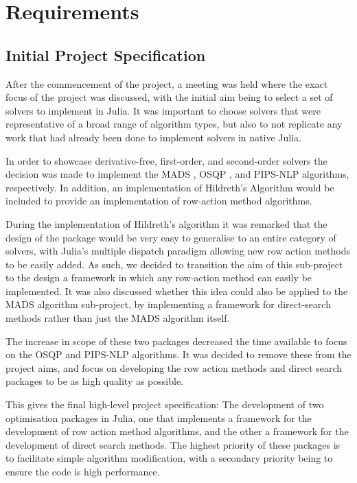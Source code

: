 \section{Requirements}\label{sec:requirements}
\subsection{Initial Project Specification}
After the commencement of the project, a meeting was held where the exact focus of the project was discussed, with the initial aim being to select a set of solvers to implement in Julia. It was important to choose solvers that were representative of a broad range of algorithm types, but also to not replicate any work that had already been done to implement solvers in native Julia. 

In order to showcase derivative-free, first-order, and second-order solvers the decision was made to implement the \ac{MADS} \cite{Audet2007MeshOptimization}, OSQP \cite{Stellato2017OSQP:Programs}, and PIPS-NLP \cite{ChiangStructuredPIPS-NLP} algorithms, respectively. In addition, an implementation of Hildreth's Algorithm \cite{HildrethAPROCEDURE} would be included to provide an implementation of row-action method algorithms. 

During the implementation of Hildreth's algorithm it was remarked that the design of the package would be very easy to generalise to an entire category of solvers, with Julia's multiple dispatch paradigm allowing new row action methods to be easily added. As such, we decided to transition the aim of this sub-project to the design a framework in which any row-action method can easily be implemented. It was also discussed whether this idea could also be applied to the \ac{MADS} algorithm sub-project, by implementing a framework for direct-search methods rather than just the \ac{MADS} algorithm itself. 

The increase in scope of these two packages decreased the time available to focus on the OSQP and PIPS-NLP algorithms. It was decided to remove these from the project aims, and focus on developing the row action methods and direct search packages to be as high quality as possible.

This gives the final high-level project specification: The development of two optimisation packages in Julia, one that implements a framework for the development of row action method algorithms, and the other a framework for the development of direct search methods. The highest priority of these packages is to facilitate simple algorithm modification, with a secondary priority being to ensure the code is high performance.

